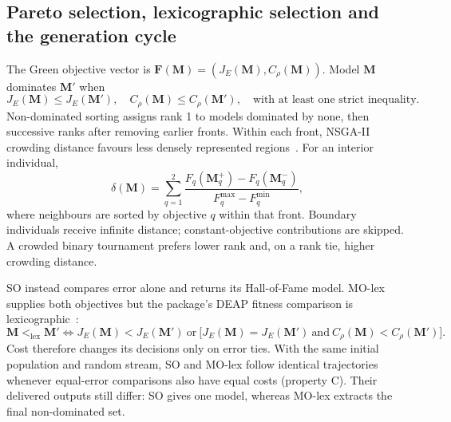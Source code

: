 \documentclass[11pt,a4paper]{article}
\theoremstyle{definition}
\theoremstyle{plain}
\theoremstyle{remark}
\newcommand{\M}{\mathbf{M}}
\newcommand{\F}{\mathbf{F}}
\begin{document}
\subsection{Pareto selection, lexicographic selection and the generation cycle}
The Green objective vector is $\F(\M)=(J_E(\M),C_\rho(\M))$. Model $\M$ dominates $\M'$ when
\begin{equation}
J_E(\M)\le J_E(\M'),\quad C_\rho(\M)\le C_\rho(\M'),
\quad\text{with at least one strict inequality}.
\label{eq:dominance}
\end{equation}
Non-dominated sorting assigns rank 1 to models dominated by none, then successive ranks after removing earlier fronts. Within each front, NSGA-II crowding distance favours less densely represented regions~\cite{DPAM2002}. For an interior individual,
\begin{equation}
\delta(\M)=\sum_{q=1}^{2}
\frac{F_q(\M_q^+)-F_q(\M_q^-)}{F_q^{\max}-F_q^{\min}},
\label{eq:crowding}
\end{equation}
where neighbours are sorted by objective $q$ within that front. Boundary individuals receive infinite distance; constant-objective contributions are skipped. A crowded binary tournament prefers lower rank and, on a rank tie, higher crowding distance.

SO instead compares error alone and returns its Hall-of-Fame model. MO-lex supplies both objectives but the package's DEAP fitness comparison is lexicographic~\cite{FDG+2012,DEAPFitness}:
\begin{equation}
\M<_{\mathrm{lex}}\M'\iff
J_E(\M)<J_E(\M')\ \text{or}\
\big[J_E(\M)=J_E(\M')\ \text{and}\ C_\rho(\M)<C_\rho(\M')\big].
\end{equation}
Cost therefore changes its decisions only on error ties. With the same initial population and random stream, SO and MO-lex follow identical trajectories whenever equal-error comparisons also have equal costs (property C). Their delivered outputs still differ: SO gives one model, whereas MO-lex extracts the final non-dominated set.
\end{document}

